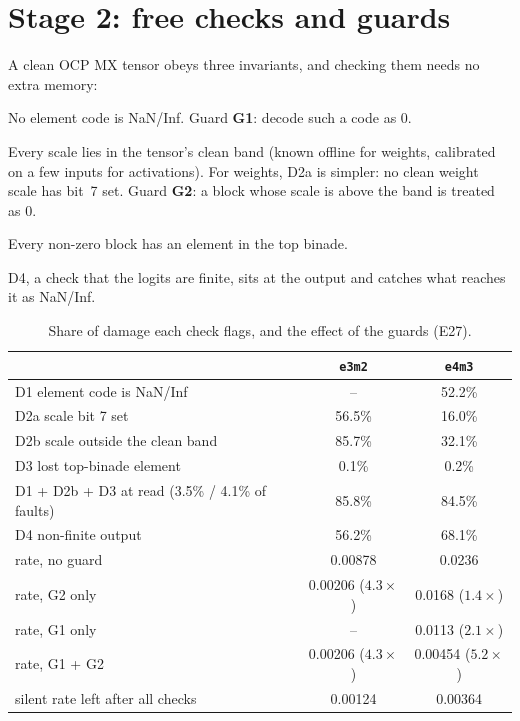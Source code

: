 \documentclass[10pt,a4paper]{article}
\newcommand{\fmt}[1]{\texttt{#1}}
\begin{document}
\section{Stage 2: free checks and guards}

A clean OCP MX tensor obeys three invariants, and checking them needs no extra memory:
\begin{description}[leftmargin=1.2em]
  \item[D1] No element code is NaN/Inf. Guard \textbf{G1}: decode such a code as 0.
  \item[D2] Every scale lies in the tensor's clean band (known offline for weights, calibrated on
        a few inputs for activations). For weights, D2a is simpler: no clean weight scale has
        bit~7 set. Guard \textbf{G2}: a block whose scale is above the band is treated as 0.
  \item[D3] Every non-zero block has an element in the top binade.
\end{description}
D4, a check that the logits are finite, sits at the output and catches what reaches it as NaN/Inf.

\begin{table}[h]
\centering
\caption{Share of damage each check flags, and the effect of the guards (E27).}
\begin{tabular}{lcc}
\toprule
 & \fmt{e3m2} & \fmt{e4m3} \\
\midrule
D1 element code is NaN/Inf & -- & 52.2\% \\
D2a scale bit 7 set & 56.5\% & 16.0\% \\
D2b scale outside the clean band & 85.7\% & 32.1\% \\
D3 lost top-binade element & 0.1\% & 0.2\% \\
D1 + D2b + D3 at read (3.5\% / 4.1\% of faults) & 85.8\% & 84.5\% \\
D4 non-finite output & 56.2\% & 68.1\% \\
\midrule
rate, no guard & 0.00878 & 0.0236 \\
rate, G2 only & 0.00206 ($4.3\times$) & 0.0168 ($1.4\times$) \\
rate, G1 only & -- & 0.0113 ($2.1\times$) \\
rate, G1 + G2 & 0.00206 ($4.3\times$) & 0.00454 ($5.2\times$) \\
silent rate left after all checks & 0.00124 & 0.00364 \\
\bottomrule
\end{tabular}
\end{table}
\end{document}
